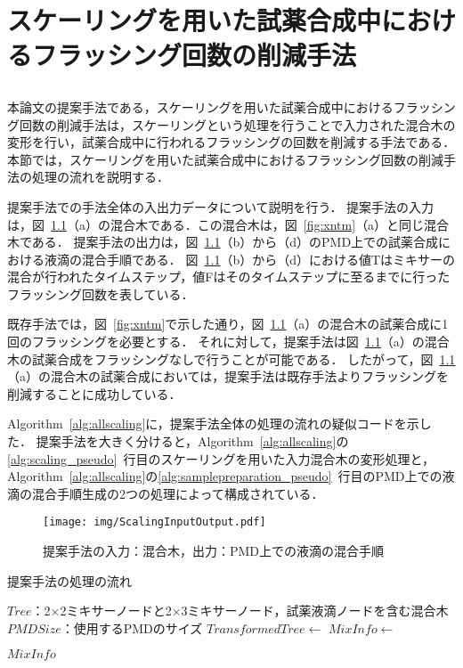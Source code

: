 \chapter{スケーリングを用いた試薬合成中におけるフラッシング回数の削減手法}
\section{}
本論文の提案手法である，スケーリングを用いた試薬合成中におけるフラッシング回数の削減手法は，スケーリングという処理を行うことで入力された混合木の変形を行い，試薬合成中に行われるフラッシングの回数を削減する手法である．
本節では，スケーリングを用いた試薬合成中におけるフラッシング回数の削減手法の処理の流れを説明する．

提案手法での手法全体の入出力データについて説明を行う．
提案手法の入力は，図~\ref{fig:ScalingInputOutput}（a）の混合木である．この混合木は，図~\ref{fig:xntm}（a）と同じ混合木である．
提案手法の出力は，図~\ref{fig:ScalingInputOutput}（b）から（d）のPMD上での試薬合成における液滴の混合手順である．
図~\ref{fig:ScalingInputOutput}（b）から（d）における値Tはミキサーの混合が行われたタイムステップ，値Fはそのタイムステップに至るまでに行ったフラッシング回数を表している．

既存手法では，図~\ref{fig:xntm}で示した通り，図~\ref{fig:ScalingInputOutput}（a）の混合木の試薬合成に1回のフラッシングを必要とする．
それに対して，提案手法は図~\ref{fig:ScalingInputOutput}（a）の混合木の試薬合成をフラッシングなしで行うことが可能である．
したがって，図~\ref{fig:ScalingInputOutput}（a）の混合木の試薬合成においては，提案手法は既存手法よりフラッシングを削減することに成功している．

Algorithm~\ref{alg:allscaling}に，提案手法全体の処理の流れの疑似コードを示した．
提案手法を大きく分けると，Algorithm~\ref{alg:allscaling}の\ref{alg:scaling_pseudo}~行目のスケーリングを用いた入力混合木の変形処理と，Algorithm~\ref{alg:allscaling}の\ref{alg:samplepreparation_pseudo}~行目のPMD上での液滴の混合手順生成の2つの処理によって構成されている．

\begin{figure}[tbp]
 \centering\texttt{[image: img/ScalingInputOutput.pdf]}
 \caption{提案手法の入力：混合木，出力：PMD上での液滴の混合手順}\label{fig:ScalingInputOutput}
\end{figure}

\begin{algorithm}[tbp]
 \caption{提案手法の処理の流れ}\label{alg:allscaling}
 \begin{algorithmic}[1]
     \Require $\mathit{Tree}$：2$\times$2ミキサーノードと2$\times$3ミキサーノード，試薬液滴ノードを含む混合木
     \Require $\mathit{PMDSize}$：使用するPMDのサイズ
     \State $\mathit{TransformedTree} \gets$  \label{alg:scaling_pseudo}
     \State $\mathit{MixInfo \gets}$  \label{alg:samplepreparation_pseudo}

      \Return $\mathit{MixInfo}$
 \end{algorithmic}
\end{algorithm}

